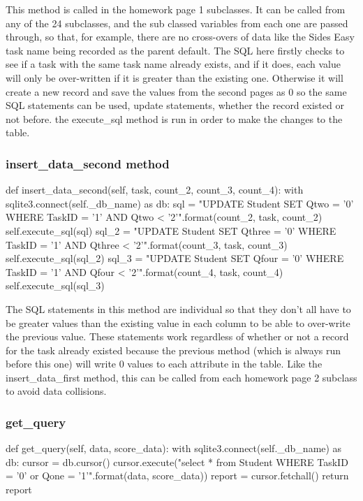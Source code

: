 This method is called in the homework page 1 subclasses. It can be called from any of the 24 subclasses, and the sub classed variables from each one are passed through, so that, for example, there are no cross-overs of data like the Sides Easy task name being recorded as the parent default. The SQL here firstly checks to see if a task with the same task name already exists, and if it does, each value will only be over-written if it is greater than the existing one. Otherwise it will create a new record and save the values from the second pages as 0 so the same SQL statements can be used, update statements, whether the record existed or not before. the execute\_sql method is run in order to make the changes to the table.

\subsubsection{insert\_data\_second method}

\begin{python}
def insert_data_second(self, task, count_2, count_3, count_4):
        with sqlite3.connect(self._db_name) as db:
            sql = "UPDATE Student SET Qtwo = '{0}' WHERE TaskID = '{1}' AND Qtwo < '{2}'".format(count_2, task, count_2)
            self.execute_sql(sql)
            sql_2 = "UPDATE Student SET Qthree = '{0}' WHERE TaskID = '{1}' AND Qthree < '{2}'".format(count_3, task, count_3)
            self.execute_sql(sql_2)
            sql_3 = "UPDATE Student SET Qfour = '{0}' WHERE TaskID = '{1}' AND Qfour < '{2}'".format(count_4, task, count_4)
            self.execute_sql(sql_3)
\end{python}

The SQL statements in this method are individual so that they don't all have to be greater values than the existing value in each column to be able to over-write the previous value. These statements work regardless of whether or not a record for the task already existed because the previous method (which is always run before this one) will write 0 values to each attribute in the table. Like the insert\_data\_first method, this can be called from each homework page 2 subclass to avoid data collisions.

\subsubsection{get\_query}

\begin{python}
    def get_query(self, data, score_data):
        with sqlite3.connect(self._db_name) as db:
            cursor = db.cursor()
            cursor.execute("select * from Student WHERE TaskID = '{0}' or Qone = '{1}'".format(data, score_data))
            report = cursor.fetchall()
            return report
\end{python}

